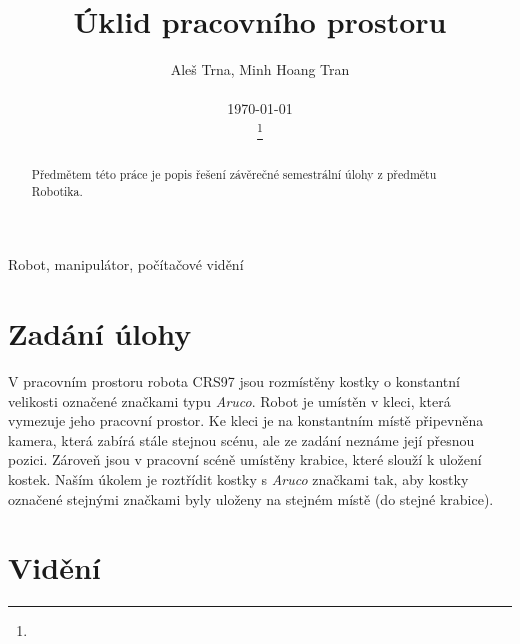 \documentclass[journal,twoside,web]{ieeecolor}
\begin{document}
    \title{Úklid pracovního prostoru}
    \author{Aleš Trna, Minh Hoang Tran \\ \begin{center}
        \today
    \end{center}
    \thanks{}}

    \maketitle

    \begin{abstract}
        Předmětem této práce je popis řešení závěrečné semestrální úlohy z předmětu Robotika.
    \end{abstract}

    \begin{IEEEkeywords}
        Robot, manipulátor, počítačové vidění
        \end{IEEEkeywords}

    \section{Zadání úlohy}
        V pracovním prostoru robota CRS97 jsou rozmístěny kostky o konstantní velikosti označené
        značkami typu \textit{Aruco}. Robot je umístěn v kleci, která vymezuje jeho pracovní prostor.
        Ke kleci je na konstantním místě připevněna kamera, která zabírá stále stejnou scénu,
        ale ze zadání neznáme její přesnou pozici. Zároveň jsou v pracovní scéně umístěny krabice,
        které slouží k uložení kostek. Naším úkolem je roztřídit kostky s \textit{Aruco}
        značkami tak, aby kostky označené stejnými značkami byly uloženy na stejném místě (do stejné krabice).

    \section{Vidění}
\end{document}
